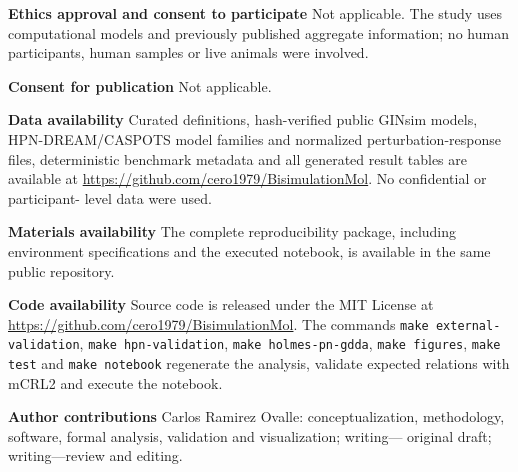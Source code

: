 \documentclass[pdflatex,sn-mathphys-ay]{sn-jnl}
\theoremstyle{definition}
\begin{document}
\noindent\textbf{Ethics approval and consent to participate} Not applicable. The study
uses computational models and previously published aggregate information; no
human participants, human samples or live animals were involved.

\noindent\textbf{Consent for publication} Not applicable.

\noindent\textbf{Data availability} Curated definitions, hash-verified public GINsim
models, HPN-DREAM/CASPOTS model families and normalized perturbation-response
files, deterministic benchmark metadata and all generated result tables are available at
\url{https://github.com/cero1979/BisimulationMol}. No confidential or participant-
level data were used.

\noindent\textbf{Materials availability} The complete reproducibility package, including
environment specifications and the executed notebook, is available in the same
public repository.

\noindent\textbf{Code availability} Source code is released under the MIT License at
\url{https://github.com/cero1979/BisimulationMol}. The commands
\texttt{make external-validation}, \texttt{make hpn-validation},
\texttt{make holmes-pn-gdda}, \texttt{make figures}, \texttt{make test}
and \texttt{make notebook} regenerate the analysis, validate expected relations
with mCRL2 and execute the notebook.

\noindent\textbf{Author contributions} Carlos Ramirez Ovalle: conceptualization,
methodology, software, formal analysis, validation and visualization; writing---
original draft; writing---review and editing.




\end{document}

